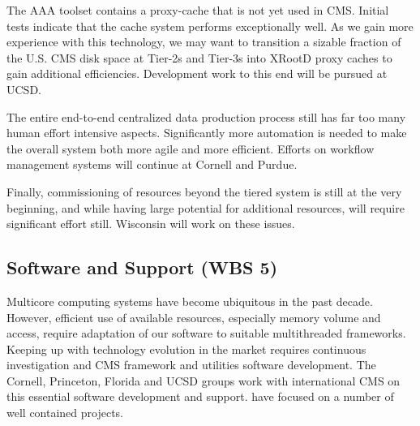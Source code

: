 \documentclass[11pt,a4paper]{article}
\begin{document}
The AAA toolset contains a proxy-cache that is not yet used in CMS.
Initial tests indicate that the cache system performs exceptionally
well. As we gain more experience with this technology, we may want to
transition a sizable fraction of the U.S. CMS disk space at Tier-2s and
Tier-3s into XRootD proxy caches to gain additional efficiencies.
Development work to this end will be pursued at UCSD.

The entire end-to-end centralized data production process still has far too
many human effort intensive aspects.  Significantly more automation is
needed to make the overall system both more agile and more efficient. 
Efforts on workflow management systems will continue at Cornell and Purdue.

Finally, commissioning of resources beyond the tiered system is still at
the very beginning, and while having large potential for additional
resources, will require significant effort still.  Wisconsin will
work on these issues.

\subsection{Software and Support (WBS 5)}

Multicore computing systems have become ubiquitous in the past
decade. However, efficient use of available resources, especially memory
volume and access, require adaptation of our software to suitable
multithreaded frameworks. Keeping up with technology evolution in the
market requires continuous investigation and CMS framework and utilities
software development.  The Cornell, Princeton, Florida and UCSD groups work
with international CMS on this essential software development and support.
have focused on a number of well contained projects.  
\end{document}
